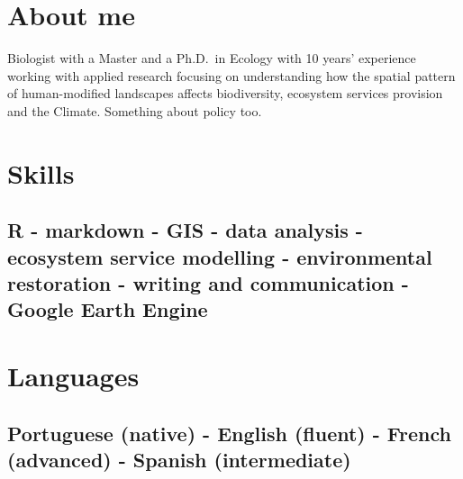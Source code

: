 \documentclass[11pt,a4paper,]{awesome-cv}
\begin{document}
\makecvheader






\hypertarget{about-me}{%
\section{About me}\label{about-me}}

Biologist with a Master and a Ph.D.~in Ecology with 10 years' experience
working with applied research focusing on understanding how the spatial
pattern of human-modified landscapes affects biodiversity, ecosystem
services provision and the Climate. Something about policy too.

\hypertarget{skills}{%
\section{Skills}\label{skills}}

\hypertarget{r---markdown---gis---data-analysis---ecosystem-service-modelling---environmental-restoration---writing-and-communication---google-earth-engine}{%
\subsection{R - markdown - GIS - data analysis - ecosystem service
modelling - environmental restoration - writing and communication -
Google Earth
Engine}\label{r---markdown---gis---data-analysis---ecosystem-service-modelling---environmental-restoration---writing-and-communication---google-earth-engine}}

\hypertarget{languages}{%
\section{Languages}\label{languages}}

\hypertarget{portuguese-native---english-fluent---french-advanced---spanish-intermediate}{%
\subsection{Portuguese (native) - English (fluent) - French (advanced) -
Spanish
(intermediate)}\label{portuguese-native---english-fluent---french-advanced---spanish-intermediate}}
\end{document}

